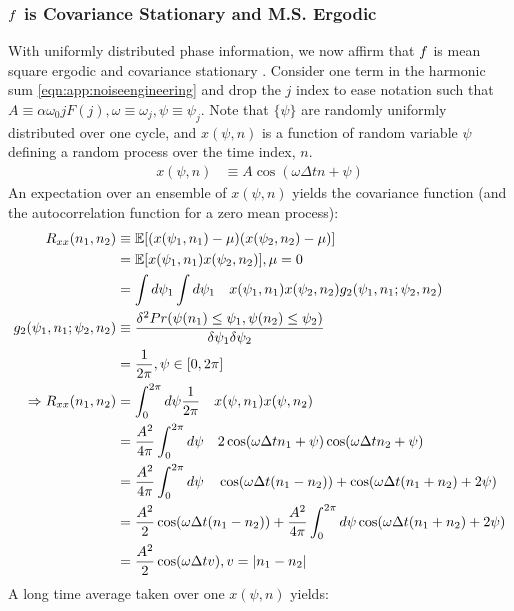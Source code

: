 \subsubsection{$f$ is Covariance Stationary and M.S. Ergodic}
With uniformly distributed phase information, we now affirm that $f$ is mean square ergodic and covariance stationary \cite{gelb1974applied}.
Consider one term in the harmonic sum \cref{eqn:app:noiseengineering} and drop the $j$ index to ease notation such that $A \equiv \alpha \omega_0 j F(j), \omega \equiv \omega_j, \psi \equiv \psi_j$. Note that $\{ \psi \}$ are randomly uniformly distributed over one cycle, and $x(\psi, n)$ is a function of random variable $\psi$ defining a random process over the time index, $n$. 
\begin{align}
x(\psi, n) & \equiv A \cos(\omega \Delta t n + \psi ) 
\end{align}
An expectation over an ensemble of $x(\psi, n)$ yields the covariance function (and the autocorrelation function for a zero mean process):
\begin{align}
R_{xx}(n_1, n_2) &\equiv \mathbb{E}[(x(\psi_1, n_1) - \mu )(x(\psi_2, n_2) - \mu )] \\
& = \mathbb{E}[x(\psi_1, n_1) x(\psi_2, n_2)], \mu = 0 \\
& = \int  d\psi_1  \int  d\psi_1  \quad x(\psi_1, n_1) x(\psi_2, n_2) g_2(\psi_1, n_1; \psi_2, n_2) \\
g_2(\psi_1, n_1; \psi_2, n_2) & \equiv \frac{\delta^2 Pr(\psi(n_1) \leq \psi_1, \psi(n_2) \leq \psi_2 )}{\delta \psi_1 \delta \psi_2} \\
& = \frac{1}{2\pi}, \psi \in [0, 2\pi] \label{eqn:SS_ensble_prob_density} \\
\Rightarrow R_{xx}(n_1, n_2) & = \int_0^{2\pi} d \psi \frac{1}{2\pi} \quad x(\psi, n_1) x(\psi, n_2) \\
& = \frac{A^2}{4\pi} \int_0^{2\pi} d \psi \quad 2\cos(\omega \Delta t n_1 + \psi) \cos(\omega \Delta t n_2 + \psi) \\
& = \frac{A^2}{4\pi} \int_0^{2\pi} d \psi \quad \cos(\omega \Delta t (n_1 -n_2))  + \cos(\omega \Delta t (n_1 + n_2) + 2\psi) \\
& = \frac{A^2}{2} \cos(\omega \Delta t (n_1 -n_2))  + \frac{A^2}{4 \pi}\int_0^{2\pi} d \psi  \cos(\omega \Delta t (n_1 + n_2) + 2\psi) \\
& = \frac{A^2}{2} \cos(\omega \Delta t v), v = |n_1 -n_2|
\end{align}
A long time average taken over one $x(\psi, n)$ yields:
